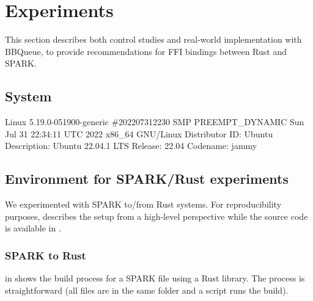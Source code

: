 \documentclass[nomenclature, english, bibtex]{kththesis}
\begin{document}



\cleardoublepage
\chapter{Experiments}
\label{ch:whatYouDid}

  



This section describes both control studies and real-world implementation with BBQueue, to provide recommendations for FFI bindings between Rust and SPARK. 





\section{System}
Linux 5.19.0-051900-generic \#202207312230 SMP PREEMPT\_DYNAMIC Sun Jul 31 22:34:11 UTC 2022 x86\_64 GNU/Linux
Distributor ID:	Ubuntu
Description:	Ubuntu 22.04.1 LTS
Release:	22.04
Codename:	jammy

\section[Environment for \& SPARK/Rust experiments]{Environment for SPARK/Rust experiments}

We experimented with SPARK to/from Rust systems. For reproducibility purposes,   describes the setup from a high-level perspective while the source code is available in .

\subsection{SPARK to Rust}

 in 
shows the build process for a SPARK file using a Rust library. The process is straightforward (all files are in the same folder and a script runs the build).
\end{document}
